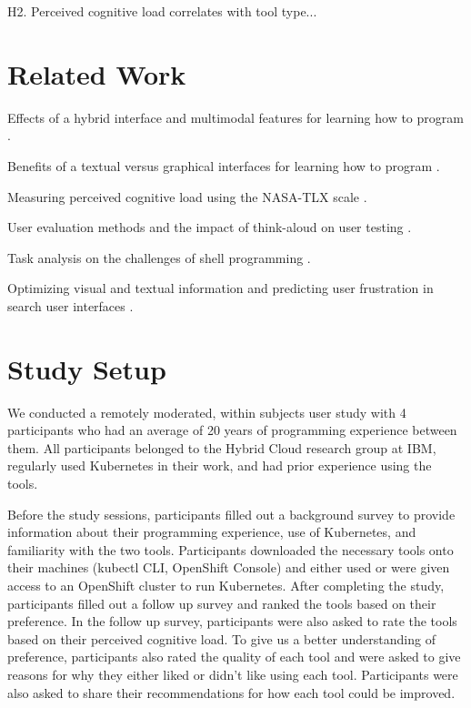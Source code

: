 \documentclass[11pt, oneside]{article}   	%
\begin{document}
H2. Perceived cognitive load correlates with tool type...

\section{Related Work}

Effects of a hybrid interface and multimodal features for learning how to program \cite{unal2021effects, grafsgaard2014additive}.

Benefits of a textual versus graphical interfaces for learning how to program \cite{dillon2012comparing}.

Measuring perceived cognitive load using the NASA-TLX scale \cite{hart1988development}.

User evaluation methods and the impact of think-aloud on user testing \cite{mcdonald2020impact, ericsson1984protocol, fox2011procedures}. 

Task analysis on the challenges of shell programming \cite{gandhi2020lightening}.

Optimizing visual and textual information and predicting user frustration in search user interfaces \cite{treharne2012optimising, feild2010predicting}.


\section{Study Setup}
We conducted a remotely moderated, within subjects user study with 4 participants who had an average of 20 years of programming experience between them. All participants belonged to the Hybrid Cloud research group at IBM, regularly used Kubernetes in their work, and had prior experience using the tools. 

Before the study sessions, participants filled out a background survey to provide information about their programming experience, use of Kubernetes, and familiarity with the two tools. Participants downloaded the necessary tools onto their machines (kubectl CLI, OpenShift Console) and either used or were given access to an OpenShift cluster to run Kubernetes. After completing the study, participants filled out a follow up survey and ranked the tools based on their preference. In the follow up survey, participants were also asked to rate the tools based on their perceived cognitive load. To give us a better understanding of preference, participants also rated the quality of each tool and were asked to give reasons for why they either liked or didn’t like using each tool. Participants were also asked to share their recommendations for how each tool could be improved.
\end{document}
